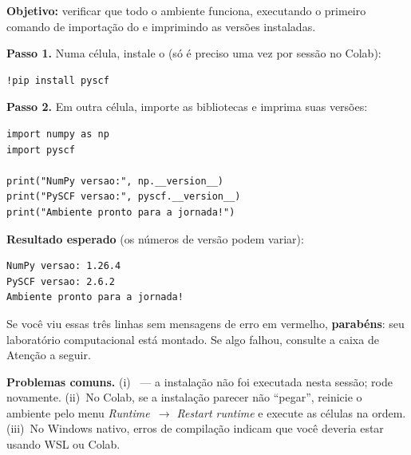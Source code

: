 \begin{caixamaos}
\textbf{Objetivo:} verificar que todo o ambiente funciona, executando o primeiro
comando de importação do \pyscf{} e imprimindo as versões instaladas.

\vspace{0.4cm}
\textbf{Passo 1.} Numa célula, instale o \pyscf{} (só é preciso uma vez por
sessão no Colab):

\begin{lstlisting}[style=console]
!pip install pyscf
\end{lstlisting}

\textbf{Passo 2.} Em outra célula, importe as bibliotecas e imprima suas versões:

\begin{lstlisting}[style=python]
import numpy as np
import pyscf

print("NumPy versao:", np.__version__)
print("PySCF versao:", pyscf.__version__)
print("Ambiente pronto para a jornada!")
\end{lstlisting}

\textbf{Resultado esperado} (os números de versão podem variar):

\begin{lstlisting}[style=console]
NumPy versao: 1.26.4
PySCF versao: 2.6.2
Ambiente pronto para a jornada!
\end{lstlisting}

\vspace{0.2cm}
Se você viu essas três linhas sem mensagens de erro em vermelho,
\textbf{parabéns}: seu laboratório computacional está montado. Se algo falhou,
consulte a caixa de Atenção a seguir.
\end{caixamaos}

\begin{caixaatencao}
\textbf{Problemas comuns.} (i)~
--- a instalação não foi executada nesta sessão; rode 
novamente. (ii)~No Colab, se a instalação parecer não ``pegar'', reinicie o
ambiente pelo menu \emph{Runtime~$\rightarrow$ Restart runtime} e execute as
células na ordem. (iii)~No Windows nativo, erros de compilação indicam que você
deveria estar usando WSL ou Colab.
\end{caixaatencao}

